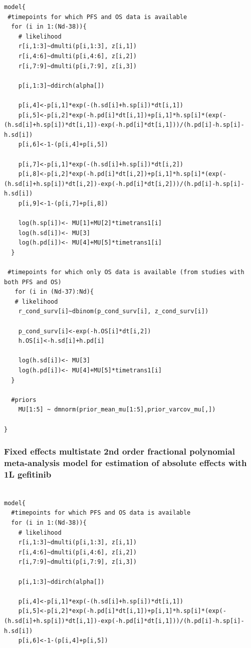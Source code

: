 \documentclass[11pt,final,fleqn]{article}\usepackage[]{graphicx}\usepackage[]{color}
\theoremstyle{plain}
\begin{document}
\begin{appendices}
\begin{verbatim}
model{
 #timepoints for which PFS and OS data is available
  for (i in 1:(Nd-38)){
    # likelihood
    r[i,1:3]~dmulti(p[i,1:3], z[i,1]) 
    r[i,4:6]~dmulti(p[i,4:6], z[i,2]) 
    r[i,7:9]~dmulti(p[i,7:9], z[i,3]) 
    
    p[i,1:3]~ddirch(alpha[])
    
    p[i,4]<-p[i,1]*exp(-(h.sd[i]+h.sp[i])*dt[i,1])
    p[i,5]<-p[i,2]*exp(-h.pd[i]*dt[i,1])+p[i,1]*h.sp[i]*(exp(-(h.sd[i]+h.sp[i])*dt[i,1])-exp(-h.pd[i]*dt[i,1]))/(h.pd[i]-h.sp[i]-h.sd[i])
    p[i,6]<-1-(p[i,4]+p[i,5])
    
    p[i,7]<-p[i,1]*exp(-(h.sd[i]+h.sp[i])*dt[i,2])
    p[i,8]<-p[i,2]*exp(-h.pd[i]*dt[i,2])+p[i,1]*h.sp[i]*(exp(-(h.sd[i]+h.sp[i])*dt[i,2])-exp(-h.pd[i]*dt[i,2]))/(h.pd[i]-h.sp[i]-h.sd[i])
    p[i,9]<-1-(p[i,7]+p[i,8])
    
    log(h.sp[i])<- MU[1]+MU[2]*timetrans1[i] 
    log(h.sd[i])<- MU[3] 
    log(h.pd[i])<- MU[4]+MU[5]*timetrans1[i]
  }
  
 #timepoints for which only OS data is available (from studies with both PFS and OS)
   for (i in (Nd-37):Nd){
   # likelihood
    r_cond_surv[i]~dbinom(p_cond_surv[i], z_cond_surv[i]) 
    
    p_cond_surv[i]<-exp(-h.OS[i]*dt[i,2])
    h.OS[i]<-h.sd[i]+h.pd[i]
    
    log(h.sd[i])<- MU[3]
    log(h.pd[i])<- MU[4]+MU[5]*timetrans1[i]
  }
    
  #priors
    MU[1:5] ~ dmnorm(prior_mean_mu[1:5],prior_varcov_mu[,]) 
  
}

\end{verbatim}

\subsubsection{Fixed effects multistate 2nd order fractional polynomial meta-analysis model for estimation of absolute effects with 1L gefitinib}

\begin{verbatim} 

model{
  #timepoints for which PFS and OS data is available
  for (i in 1:(Nd-38)){
    # likelihood
    r[i,1:3]~dmulti(p[i,1:3], z[i,1]) 
    r[i,4:6]~dmulti(p[i,4:6], z[i,2]) 
    r[i,7:9]~dmulti(p[i,7:9], z[i,3]) 
    
    p[i,1:3]~ddirch(alpha[])
    
    p[i,4]<-p[i,1]*exp(-(h.sd[i]+h.sp[i])*dt[i,1])
    p[i,5]<-p[i,2]*exp(-h.pd[i]*dt[i,1])+p[i,1]*h.sp[i]*(exp(-(h.sd[i]+h.sp[i])*dt[i,1])-exp(-h.pd[i]*dt[i,1]))/(h.pd[i]-h.sp[i]-h.sd[i])
    p[i,6]<-1-(p[i,4]+p[i,5])
    

\end{verbatim}
\end{appendices}
\end{document}
